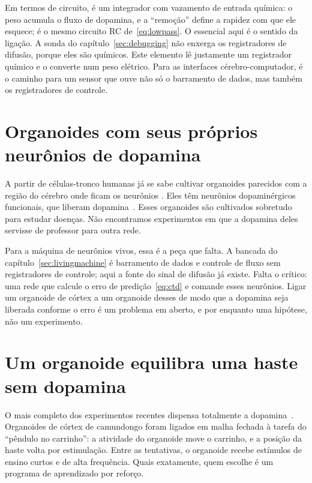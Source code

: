 Em termos de circuito, é um integrador com vazamento de entrada química: o peso acumula o fluxo de dopamina, e a ``remoção'' define a rapidez com que ele esquece; é o mesmo circuito RC de~\eqref{eq:lowpass}. O essencial aqui é o sentido da ligação. A sonda do capítulo~\ref{sec:debugging} não enxerga os registradores de difusão, porque eles são químicos. Este elemento lê justamente um registrador químico e o converte num peso elétrico. Para as interfaces cérebro-computador, é o caminho para um sensor que ouve não só o barramento de dados, mas também os registradores de controle.

\section{Organoides com seus próprios neurônios de dopamina}
\label{sec:midbrainorg}

A partir de células-tronco humanas já se sabe cultivar organoides parecidos com a região do cérebro onde ficam os neurônios . Eles têm neurônios dopaminérgicos funcionais, que liberam dopamina~\cite{Jo2016}. Esses organoides são cultivados sobretudo para estudar doenças. Não encontramos experimentos em que a dopamina deles servisse de professor para outra rede.

Para a máquina de neurônios vivos, essa é a peça que falta. A bancada do capítulo~\ref{sec:livingmachine} é barramento de dados e controle de fluxo sem registradores de controle; aqui a fonte do sinal de difusão já existe. Falta o crítico: uma rede que calcule o erro de predição~\eqref{eq:ctd} e comande esses neurônios. Ligar um organoide de córtex a um organoide desses de modo que a dopamina seja liberada conforme o erro é um problema em aberto, e por enquanto uma hipótese, não um experimento.

\section{Um organoide equilibra uma haste sem dopamina}
\label{sec:cartpole}

O mais completo dos experimentos recentes dispensa totalmente a dopamina~\cite{Robbins2026}. Organoides de córtex de camundongo foram ligados em malha fechada à tarefa do ``pêndulo no carrinho'': a atividade do organoide move o carrinho, e a posição da haste volta por estimulação. Entre as tentativas, o organoide recebe estímulos de ensino curtos e de alta frequência. Quais exatamente, quem escolhe é um programa de aprendizado por reforço.


